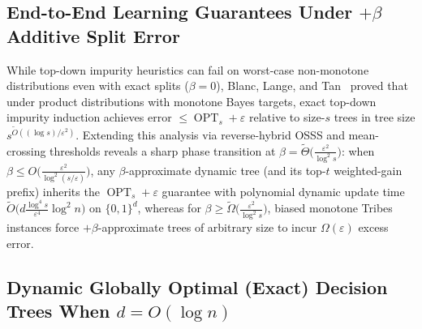 \documentclass[11pt]{article}
\theoremstyle{definition}
\newcommand{\OPT}{\operatorname{OPT}}
\begin{document}
\subsection{End-to-End Learning Guarantees Under \texorpdfstring{$+\beta$}{+beta} Additive Split Error}

While top-down impurity heuristics can fail on worst-case non-monotone distributions even with exact splits ($\beta = 0$), Blanc, Lange, and Tan~\cite{blanc2020agnostic} proved that under product distributions with monotone Bayes targets, exact top-down impurity induction achieves error $\le \OPT_s + \varepsilon$ relative to size-$s$ trees in tree size $s^{\tilde{O}((\log s)/\varepsilon^2)}$. Extending this analysis via reverse-hybrid OSSS and mean-crossing thresholds reveals a sharp phase transition at $\beta = \tilde{\Theta}\big(\frac{\varepsilon^2}{\log^2 s}\big)$: when $\beta \le O\big(\frac{\varepsilon^2}{\log^2(s/\varepsilon)}\big)$, any $\beta$-approximate dynamic tree (and its top-$t$ weighted-gain prefix) inherits the $\OPT_s + \varepsilon$ guarantee with polynomial dynamic update time $\tilde{O}\big(d \frac{\log^4 s}{\varepsilon^4}\log^2 n\big)$ on $\{0,1\}^d$, whereas for $\beta \ge \tilde{\Omega}\big(\frac{\varepsilon^2}{\log^2 s}\big)$, biased monotone Tribes instances force $+\beta$-approximate trees of arbitrary size to incur $\Omega(\varepsilon)$ excess error.

\subsection{Dynamic Globally Optimal (Exact) Decision Trees When \texorpdfstring{$d = O(\log n)$}{d = O(log n)}}
\end{document}
